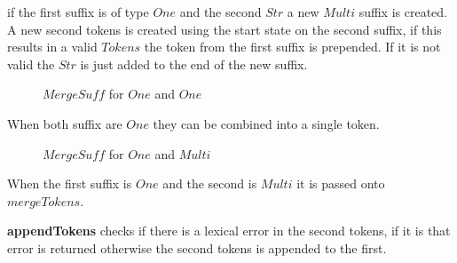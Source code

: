 if the first suffix is of type $One$ and the second $Str$ a new $Multi$ suffix
is created. A new second tokens is created using the start state on the second
suffix, if this results in a valid $Tokens$ the token from the first suffix is
prepended. If it is not valid the $Str$ is just added to the end of the new
suffix.

\begin{figure}[h!]
  
  \caption{$MergeSuff$ for $One$ and $One$ \label{fig:msoneone}}
\end{figure}

When both suffix are $One$ they can be combined into a single token.

\begin{figure}[h!]
  
  \caption{$MergeSuff$ for $One$ and $Multi$ \label{fig:msonemulti}}
\end{figure}

When the first suffix is $One$ and the second is $Multi$ it is passed onto
$mergeTokens$.

\textbf{appendTokens} checks if there is a lexical error in the second tokens,
if it is that error is returned otherwise the second tokens is appended to the
first.

